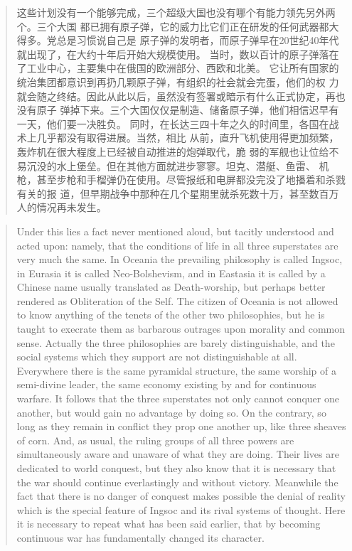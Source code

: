 \begin{paracol}{2}
\switchcolumn

\begin{quotation}
这些计划没有一个能够完成，三个超级大国也没有哪个有能力领先另外两个。三个大国
都已拥有原子弹，它的威力比它们正在研发的任何武器都大得多。党总是习惯说自己是
原子弹的发明者，而原子弹早在20世纪40年代就出现了，在大约十年后开始大规模使用。
当时，数以百计的原子弹落在了工业中心，主要集中在俄国的欧洲部分、西欧和北美。
它让所有国家的统治集团都意识到再扔几颗原子弹，有组织的社会就会完蛋，他们的权
力就会随之终结。因此从此以后，虽然没有签署或暗示有什么正式协定，再也没有原子
弹掉下来。三个大国仅仅是制造、储备原子弹，他们相信迟早有一天，他们要一决胜负。
同时，在长达三四十年之久的时间里，各国在战术上几乎都没有取得进展。当然，相比
从前，直升飞机使用得更加频繁，轰炸机在很大程度上已经被自动推进的炮弹取代，脆
弱的军舰也让位给不易沉没的水上堡垒。但在其他方面就进步寥寥。坦克、潜艇、鱼雷、
机枪，甚至步枪和手榴弹仍在使用。尽管报纸和电屏都没完没了地播着和杀戮有关的报
道，但早期战争中那种在几个星期里就杀死数十万，甚至数百万人的情况再未发生。
\end{quotation}

\switchcolumn*

\begin{quotation}
Under this lies a fact never mentioned aloud, but tacitly understood and
acted upon: namely, that the conditions of life in all three superstates
are very much the same. In Oceania the prevailing philosophy is called
Ingsoc, in Eurasia it is called Neo-Bolshevism, and in Eastasia it is
called by a Chinese name usually translated as Death-worship, but
perhaps better rendered as Obliteration of the Self. The citizen of
Oceania is not allowed to know anything of the tenets of the other two
philosophies, but he is taught to execrate them as barbarous outrages
upon morality and common sense. Actually the three philosophies are
barely distinguishable, and the social systems which they support are
not distinguishable at all. Everywhere there is the same pyramidal
structure, the same worship of a semi-divine leader, the same economy
existing by and for continuous warfare. It follows that the three
superstates not only cannot conquer one another, but would gain no
advantage by doing so. On the contrary, so long as they remain in
conflict they prop one another up, like three sheaves of corn. And, as
usual, the ruling groups of all three powers are simultaneously aware
and unaware of what they are doing. Their lives are dedicated to world
conquest, but they also know that it is necessary that the war should
continue everlastingly and without victory. Meanwhile the fact that
there is no danger of conquest makes possible the denial of reality
which is the special feature of Ingsoc and its rival systems of thought.
Here it is necessary to repeat what has been said earlier, that by
becoming continuous war has fundamentally changed its character.
\end{quotation}


\end{paracol}
